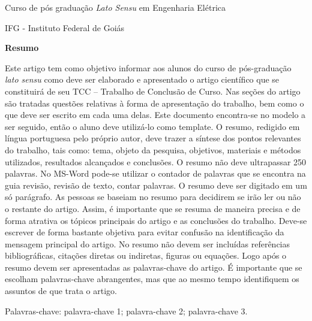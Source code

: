 \documentclass[a4paper, 12pt, oneside] {article}
\begin{document}
\singlespacing %
\justifying %




\begin{center}

    \par {{Curso de pós graduação \textit{Lato Sensu} em Engenharia Elétrica}}
    \par {{IFG - Instituto Federal de Goiás}}
    
\end{center}

\noindent \textbf{Resumo}
\singlespacing

\noindent Este artigo tem como objetivo informar aos alunos do curso de pós-graduação \textit{lato sensu} como deve ser elaborado e apresentado o artigo científico que se constituirá de seu TCC – Trabalho de Conclusão de Curso. Nas seções do artigo são tratadas questões relativas à forma de apresentação do trabalho, bem como o que deve ser escrito em cada uma delas. Este documento encontra-se no modelo a ser seguido, então o aluno deve utilizá-lo como template. O resumo, redigido em língua portuguesa pelo próprio autor, deve trazer a síntese dos pontos relevantes do trabalho, tais como: tema, objeto da pesquisa, objetivos, materiais  e métodos utilizados, resultados alcançados e conclusões. O resumo não deve ultrapassar  250 palavras. No MS-Word pode-se utilizar o contador de palavras que se encontra na guia revisão, revisão de texto, contar palavras. O resumo deve ser digitado em um só parágrafo. As pessoas se baseiam no resumo para decidirem se irão ler ou não o restante do artigo. Assim, é importante que se resuma de maneira precisa e de forma atrativa os tópicos principais do artigo e as conclusões do trabalho. Deve-se escrever de forma bastante objetiva para evitar confusão na identificação da mensagem principal do artigo. No resumo não devem ser incluídas referências bibliográficas, citações diretas ou indiretas, figuras ou equações. Logo após o resumo devem ser apresentadas as palavras-chave do artigo. É importante que se escolham palavras-chave abrangentes, mas que ao mesmo tempo identifiquem os assuntos de que trata o artigo.\singlespacing

\noindent  Palavras-chave: palavra-chave 1; palavra-chave 2; palavra-chave 3. \bigskip


\end{document}
